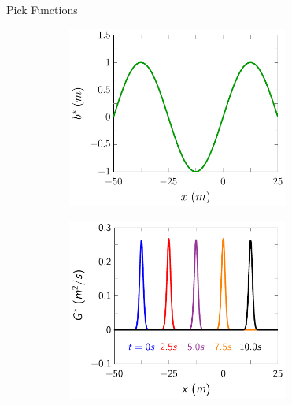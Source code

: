 \documentclass[handout]{beamer}
\begin{document}
\begin{frame}{Pick Functions}
\begin{figure}
\begin{subfigure}{0.5\textwidth}
	\end{subfigure}
	\begin{subfigure}{0.5\textwidth}
		\includegraphics[width=0.8\textwidth]{./Pics/DryBed/Forced/binitial.pdf}
	\end{subfigure}%
	\begin{subfigure}{0.5\textwidth}
		\includegraphics[width=0.8\textwidth]{./Pics/DryBed/Forced/G.pdf}
	\end{subfigure}
\end{figure}
	
\end{frame}
\end{document}
